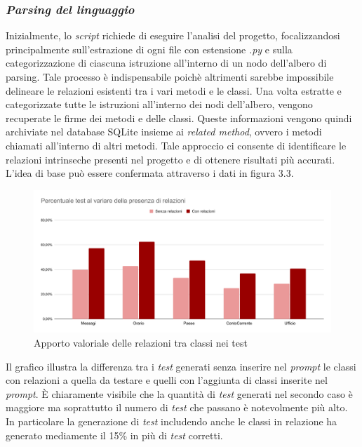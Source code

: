    \subsubsection{\textit{Parsing del linguaggio}}
    Inizialmente, lo \textit{script} richiede di eseguire l'analisi del progetto, focalizzandosi principalmente sull'estrazione di ogni file con estensione \textit{.py}
    e sulla categorizzazione di ciascuna istruzione all'interno di un nodo dell'albero di parsing. Tale processo è indispensabile poichè altrimenti sarebbe 
    impossibile delineare le relazioni esistenti tra i vari metodi e le classi.
    Una volta estratte e categorizzate tutte le istruzioni all'interno dei nodi dell'albero, vengono recuperate le firme dei metodi e delle classi. 
    Queste informazioni vengono quindi archiviate nel database SQLite insieme ai \textit{related method}, ovvero i metodi chiamati all'interno di altri metodi. 
    Tale approccio ci consente di identificare le relazioni intrinseche presenti nel progetto e di ottenere risultati più accurati.
    L'idea di base può essere confermata attraverso i dati in figura 3.3.
    \begin{figure}[!h]
        \centering        
        \includegraphics[width=14.5cm]{img/Percentuale test al variare della presenza di relazioni.pdf}
        \caption{Apporto valoriale delle relazioni tra classi nei test}
    \end{figure}
     Il grafico illustra la differenza tra i \textit{test} generati senza inserire nel \textit{prompt} le classi con relazioni a quella da testare e quelli 
    con l'aggiunta di classi inserite nel \textit{prompt}. È chiaramente visibile che la quantità di \textit{test} generati nel secondo caso è maggiore ma soprattutto il numero di \textit{test} che passano è notevolmente più alto.
    In particolare la generazione di \textit{test} includendo anche le classi in relazione ha generato mediamente il 15\% in più di \textit{test} corretti.
